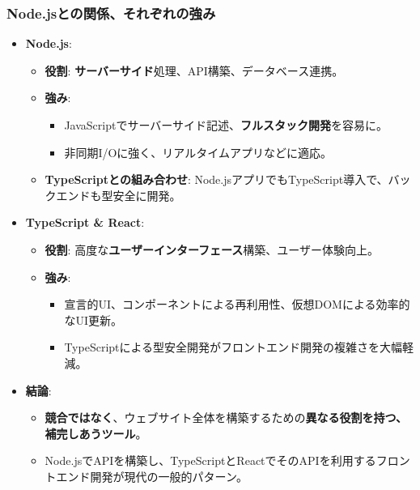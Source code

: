 \documentclass{beamer}
\begin{document}
\begin{frame}
    \frametitle{Node.jsとの関係、それぞれの強み}
    \begin{itemize}
        \item \textbf{Node.js}:
            \begin{itemize}
                \item \textbf{役割}: \textbf{サーバーサイド}処理、API構築、データベース連携。
                \item \textbf{強み}:
                    \begin{itemize}
                        \item JavaScriptでサーバーサイド記述、\textbf{フルスタック開発}を容易に。
                        \item 非同期I/Oに強く、リアルタイムアプリなどに適応。
                    \end{itemize}
                \item \textbf{TypeScriptとの組み合わせ}: Node.jsアプリでもTypeScript導入で、バックエンドも型安全に開発。
            \end{itemize}
        \item \textbf{TypeScript \& React}:
            \begin{itemize}
                \item \textbf{役割}: 高度な\textbf{ユーザーインターフェース}構築、ユーザー体験向上。
                \item \textbf{強み}:
                    \begin{itemize}
                        \item 宣言的UI、コンポーネントによる再利用性、仮想DOMによる効率的なUI更新。
                        \item TypeScriptによる型安全開発がフロントエンド開発の複雑さを大幅軽減。
                    \end{itemize}
            \end{itemize}
        \item \textbf{結論}:
            \begin{itemize}
                \item \textbf{競合ではなく}、ウェブサイト全体を構築するための\textbf{異なる役割を持つ、補完しあうツール}。
                \item Node.jsでAPIを構築し、TypeScriptとReactでそのAPIを利用するフロントエンド開発が現代の一般的パターン。
            \end{itemize}
    \end{itemize}
\end{frame}
\end{document}
